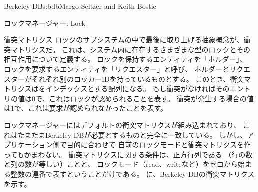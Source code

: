 \begin{aosachapter}{Berkeley DB}{s:bdb}{Margo Seltzer and Keith Bostic}
\begin{aosasect1}{ロックマネージャー: Lock}
\begin{aosasect2}{衝突マトリクス}
ロックのサブシステムの中で最後に取り上げる抽象概念が、衝突マトリクスだ。
これは、システム内に存在するさまざまな型のロックとその相互作用について定義する。
ロックを保持するエンティティを「ホルダー」、
ロックを要求するエンティティを「リクエスター」と呼び、
ホルダーとリクエスターがそれぞれ別のロッカーIDを持っているものとする。
このとき、衝突マトリクスは\code{[requester][holder]}をインデックスとする配列になる。
もし衝突がなければそのエントリの値は0で、これはロックが認められることを表す。
衝突が発生する場合の値は1で、これは要求が認められなかったことを表す。

ロックマネージャーにはデフォルトの衝突マトリクスが組み込まれており、
これはたまたまBerkeley DBが必要とするものと完全に一致している。
しかし、アプリケーション側で目的に合わせて
自前のロックモードと衝突マトリクスを作ってもかまわない。
衝突マトリクスに関する条件は、正方行列である
（行の数と列の数が等しい）ことと、
ロックモード（read、writeなど）をゼロから始まる整数の連番で表すということだけである。
に、Berkeley DBの衝突マトリクスを示す。


\end{aosasect2}
\end{aosasect1}
\end{aosachapter}
